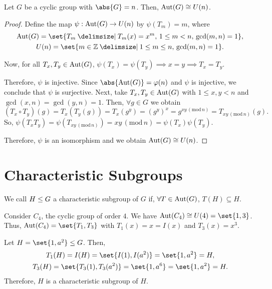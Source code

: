 \documentclass[11pt]{penrose}
\begin{document}
\begin{nthm}
    Let $G$ be a cyclic group with $\abs{G} = n$. Then, $\operatorname{Aut}(G) \mathrel{\cong} U(n)$.
\end{nthm}
\begin{proof}
    Define the map $\psi : \operatorname{Aut}(G) \to U(n)$ by $\psi(T_{m}) = m$, where
    \begin{gather*}
        \Aut(G) = \set{T_{m} \st T_{m}(x) = x^{m},\, 1 \leq m < n,\, \gcd(m,n) = 1},\\
        U(n) = \set{m \in \Z \st 1 \leq m \leq n,\, \gcd(m, n) = 1}.
    \end{gather*}

    Now, for all $T_{x}, T_{y} \in \operatorname{Aut}(G)$, $\psi(T_{x}) = \psi(T_{y}) \implies x = y \implies T_{x} = T_{y}$.

    Therefore, $\psi$ is injective. Since $\abs{\Aut(G)} = \varphi(n)$ and $\psi$ is injective, we conclude that $\psi$ is surjective. Next, take $T_{x}, T_{y} \in \operatorname{Aut}(G)$ with $1 \leq x, y < n$ and $\gcd(x,n) = \gcd(y,n) = 1$. Then, $\forall g \in G$ we obtain
    \begin{equation*}
        (T_{x} \circ T_{y})(g)
        = T_{x}( T_{y}(g) )
        = T_{x}( g^{y} )
        = (g^{y})^{x}
        = g^{xy \,(\mathrm{mod}\, n)}
        = T_{xy \,(\mathrm{mod}\, n)}(g).
    \end{equation*}
    So, $\psi(T_{x} T_{y}) = \psi( T_{xy \,(\mathrm{mod}\, n)} ) = xy \,(\mathrm{mod}\, n) = \psi(T_{x}) \psi(T_{y})$.

    Therefore, $\psi$ is an isomorphism and we obtain $\operatorname{Aut}(G) \mathrel{\cong} U(n)$.
\end{proof}

\section{Characteristic Subgroups}

\begin{ndfn}
    We call $H \mathrel{\leq} G$ a characteristic subgroup of $G$ if, $\forall T \in \operatorname{Aut}(G)$, $T(H) \subseteq H$.
\end{ndfn}

\begin{negg}
    Consider $C_{4}$, the cyclic group of order $4$. We have $\Aut(C_{4}) \isom U(4) = \set{1,3}$. Thus, $\Aut(C_{4}) = \set{T_{1}, T_{3}}$ with $T_{1}(x) = x = I(x)$ and $T_{3}(x) = x^{3}$.

    Let $H = \set{1, a^{2}} \subgroup G$. Then,
    \begin{gather*}
        T_{1}(H) = I(H) = \set{I(1), I(a^{2})} = \set{1, a^{2}} = H,\\
        T_{3}(H) = \set{T_{3}(1), T_{3}(a^{2})} = \set{1, a^{6}} = \set{1, a^{2}} = H.
    \end{gather*}
    Therefore, $H$ is a characteristic subgroup of $H$.
\end{negg}
\end{document}
